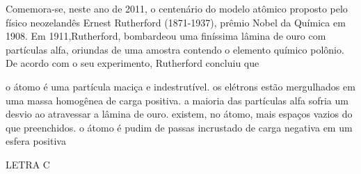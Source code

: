 \documentclass[9 pt]{scrartcl}
\def\PQ{0.84} %
\begin{document}
\begin{exercise}[points=\PQ]
Comemora-se, neste ano de 2011, o centenário do modelo atômico proposto pelo
físico neozelandês Ernest Rutherford (1871-1937), prêmio Nobel da Química em 1908. Em 1911,Rutherford, bombardeou uma finíssima lâmina de ouro com partículas alfa, oriundas de uma amostra contendo o elemento químico polônio. De acordo com o seu experimento, Rutherford concluiu que

\begin{choice}
\choice o átomo é uma partícula maciça e indestrutível.
\choice os elétrons estão mergulhados em uma massa homogênea de carga positiva.
\choice a maioria das partículas alfa sofria um desvio ao atravessar a lâmina de ouro.
\choice existem, no átomo, mais espaços vazios do que preenchidos.
\choice o átomo é pudim de passas incrustado de carga negativa em um esfera positiva
\end{choice}
\end{exercise}
\begin{solution}
LETRA C
\end{solution}
\end{document}
